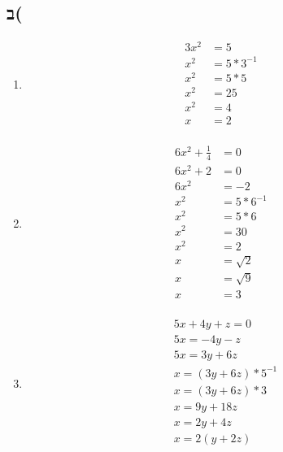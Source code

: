 \documentclass{article}
\begin{document}
\subsection{ב(}
\begin{enumerate}
 
\item 
\begin{align*}
  3x^{2} &= 5  \\
  x^{2} &= 5 * 3^{-1}\\
  x^{2} &= 5 * 5\\
  x^{2} &= 25\\
  x^{2} &= 4\\
  x &= 2\\
\end{align*}

\clearpage
\item 
\begin{align*}
  6x^{2} + \frac{1}{4} &= 0\\ 
  6x^{2} + 2 &= 0\\ 
  6x^{2} &= -2\\ 
  x^{2} &= 5 * 6^{-1}\\ 
  x^{2} &= 5 * 6\\ 
  x^{2} &= 30\\ 
  x^{2} &= 2\\ 
  x &=  \sqrt{2} \\ 
  x &=  \sqrt{9} \\ 
  x &=  3 \\ 
\end{align*}

\item 
\begin{align*}
  &5x+4y+z = 0\\ 
  &5x = -4y - z\\ 
  &5x = 3y + 6z\\ 
  &x = (3y + 6z)*5^{-1}\\ 
  &x = (3y + 6z)*3\\ 
  &x = 9y + 18z\\ 
  &x = 2y + 4z\\ 
  &x = 2(y + 2z)\\ 
\end{align*}


\end{enumerate}
\end{document}
